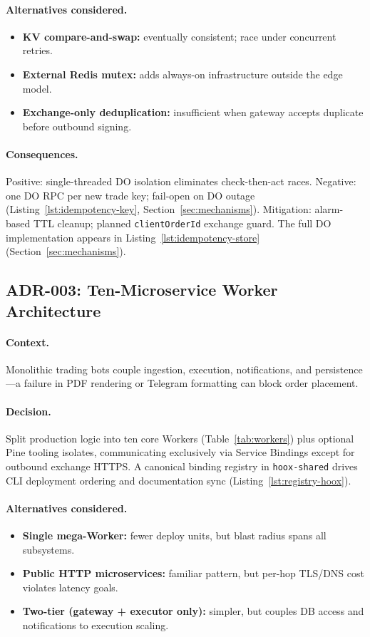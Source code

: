\paragraph{Alternatives considered.}
\begin{itemize}
  \item \textbf{KV compare-and-swap:} eventually consistent; race under concurrent retries.
  \item \textbf{External Redis mutex:} adds always-on infrastructure outside the edge model.
  \item \textbf{Exchange-only deduplication:} insufficient when gateway accepts duplicate before outbound signing.
\end{itemize}

\paragraph{Consequences.} Positive: single-threaded DO isolation eliminates check-then-act races. Negative: one DO RPC per new trade key; fail-open on DO outage (Listing~\ref{lst:idempotency-key}, Section~\ref{sec:mechanisms}). Mitigation: alarm-based TTL cleanup; planned \texttt{clientOrderId} exchange guard. The full DO implementation appears in Listing~\ref{lst:idempotency-store} (Section~\ref{sec:mechanisms}).

\subsection{ADR-003: Ten-Microservice Worker Architecture}

\paragraph{Context.} Monolithic trading bots couple ingestion, execution, notifications, and persistence---a failure in PDF rendering or Telegram formatting can block order placement.

\paragraph{Decision.} Split production logic into ten core Workers (Table~\ref{tab:workers}) plus optional Pine tooling isolates, communicating exclusively via Service Bindings except for outbound exchange HTTPS. A canonical binding registry in \texttt{hoox-shared} drives CLI deployment ordering and documentation sync (Listing~\ref{lst:registry-hoox}).

\paragraph{Alternatives considered.}
\begin{itemize}
  \item \textbf{Single mega-Worker:} fewer deploy units, but blast radius spans all subsystems.
  \item \textbf{Public HTTP microservices:} familiar pattern, but per-hop TLS/DNS cost violates latency goals.
  \item \textbf{Two-tier (gateway + executor only):} simpler, but couples DB access and notifications to execution scaling.
\end{itemize}

